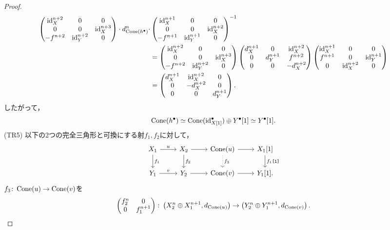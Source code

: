 \begin{proof}
\begin{align*}
	\begin{pmatrix}
		\mathrm{id}^{n+2}_X & 0 & 0\\
		 0 & 0 & \mathrm{id}^{n+3}_{X} \\
		-f^{n+2} & \mathrm{id}^{n+2}_{Y} & 0
	\end{pmatrix}\cdot
	d^n_{\operatorname{\mathrm{Cone}}({h^\bullet})} 
	\cdot &
	\begin{pmatrix}
		\mathrm{id}^{n+1}_X & 0 & 0\\
		 0 & 0 & \mathrm{id}^{n+2}_{X} \\
		-f^{n+1} & \mathrm{id}^{n+1}_{Y} & 0
	\end{pmatrix}^{-1} \\
	&=\begin{pmatrix}
		\mathrm{id}^{n+2}_X & 0 & 0\\
		 0 & 0 & \mathrm{id}^{n+3}_{X} \\
		-f^{n+2} & \mathrm{id}^{n+2}_{Y} & 0
	\end{pmatrix}
	\begin{pmatrix}
		d^{n+1}_X & 0 & \mathrm{id}^{n+2}_{X}\\
		0 & d^{n+1}_Y & f^{n+2}\\
		0 & 0 &-d^{n+2}_X
	\end{pmatrix}
	\begin{pmatrix}
		\mathrm{id}^{n+1}_X & 0 & 0\\
		f^{n+1} & 0 & \mathrm{id}^{n+1}_{Y} \\
		0 & \mathrm{id}^{n+2}_{X} & 0
	\end{pmatrix}\\
	&=
	\begin{pmatrix}
		d^{n+1}_X &	\mathrm{id}^{n+2}_X & 0\\
		0 &	-d^{n+2}_X & 0\\
		0 &	0 & d^{n+1}_Y\\
	\end{pmatrix}.
\end{align*}
したがって，
\[\operatorname{\mathrm{Cone}}(h^\bullet)\simeq \operatorname{\mathrm{Cone}}(\mathrm{id}^{\bullet}_{X[1]})\oplus Y^\bullet[1]\simeq Y^\bullet[1].\]
(TR5) 以下の2つの完全三角形と可換にする射$f_1,f_2$に対して，
		\[
		\begin{tikzcd}
			X_1\ar[r,"u"]\ar[d,"f_1"]& X_2\ar[r]\ar[d,"f_2"]& \Cone(u)\ar[r]\ar[d,"f_3",dotted] & X_1[1]\ar[d,"f_1\texttt{[1]}"]\\
			Y_1\ar[r,"v"]& Y_2\ar[r]& \Cone(v)\ar[r] & Y_1[1].
		\end{tikzcd}
	\]
	$f_3\colon \operatorname{\mathrm{Cone}}(u)\to \operatorname{\mathrm{Cone}}(v)$を
	\[\begin{pmatrix}f_2^n & 0 \\ 0 & f_1^{n+1}\end{pmatrix}\colon \left(X_2^n\oplus X_1^{n+1}, d_{\operatorname{\mathrm{Cone}}(u)}\right)\rightarrow \left(Y_2^n\oplus Y_1^{n+1}, d_{\operatorname{\mathrm{Cone}}(v)}\right).\]

\end{proof}
